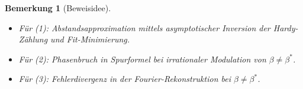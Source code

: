 \documentclass[12pt]{article}
\newtheorem{remark}{Bemerkung}
\begin{document}
\begin{remark}[Beweisidee]
\leavevmode
\begin{itemize}
    \item Für (1): Abstandsapproximation mittels asymptotischer Inversion der Hardy-Zählung und Fit-Minimierung.
    \item Für (2): Phasenbruch in Spurformel bei irrationaler Modulation von \( \beta \ne \beta^* \).
    \item Für (3): Fehlerdivergenz in der Fourier-Rekonstruktion bei \( \beta \ne \beta^* \).
\end{itemize}
\end{remark}
\end{document}
